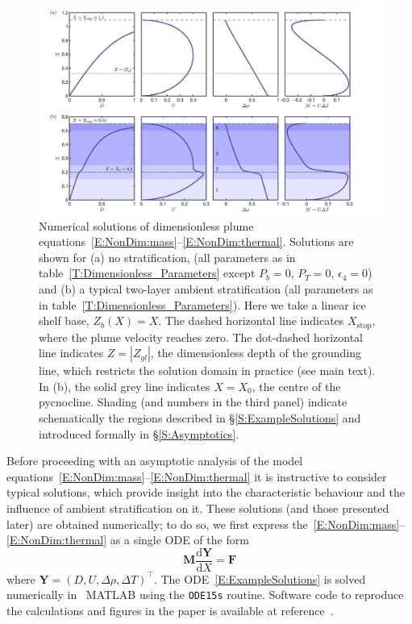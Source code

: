 \documentclass[openacc]{rsproca_new}%
\newcommand{\dd}[2]{\frac{\mathrm{d} #1}{\mathrm{d} #2}}
\newcommand{\epsfour}{\epsilon_{4}}
\newcommand{\Pt}{\textit{P}_T}
\begin{document}
\begin{figure}
\centering
\includegraphics[width = \textwidth]{Submitted_PRSA/make_plots/plots/figure3.png}
\caption{Numerical solutions of dimensionless plume equations~\eqref{E:NonDim:mass}--\eqref{E:NonDim:thermal}. Solutions are shown for (a) no stratification, (all parameters as in table~\ref{T:Dimensionless_Parameters} except $P_b = 0$, $\Pt = 0$, $\epsfour = 0$) and (b)  a typical two-layer ambient stratification (all parameters as in table~\ref{T:Dimensionless_Parameters}). Here we take a linear ice shelf base, $Z_b(X) = X$. The dashed horizontal line indicates $X_{\text{stop}}$, where the plume velocity reaches zero. The dot-dashed horizontal line indicates $Z = |Z_{gl}|$, the dimensionless depth of the grounding line, which restricts the solution domain in practice (see main text). In (b), the solid grey line indicates $X = X_0$, the centre of the pycnocline. Shading (and numbers in the third panel) indicate schematically the regions described in \S\ref{S:ExampleSolutions} and introduced formally in \S\ref{S:Asymptotics}. }\label{fig:ExampleSols}
\end{figure}

Before proceeding with an asymptotic analysis of the model equations~\eqref{E:NonDim:mass}--\eqref{E:NonDim:thermal} it is instructive to consider typical solutions, which provide insight into the characteristic behaviour and the influence of ambient stratification on it. These solutions (and those presented later) are obtained numerically; to do so, we first express the~\eqref{E:NonDim:mass}--\eqref{E:NonDim:thermal} as a single ODE of the form
\begin{equation}\label{E:ExampleSolutions}
\mathbf{M} \dd{\mathbf{Y}}{X} = \mathbf{F}
\end{equation}
where $\mathbf{Y} = (D, U, \Delta \rho, \Delta T)^\intercal$. The ODE~\eqref{E:ExampleSolutions} is solved numerically in ~\textsc{MATLAB} using the \texttt{ODE15s} routine. Software code to reproduce the calculations and figures in the paper is available at reference~\citep{PycnoclineCode}.
\end{document}

